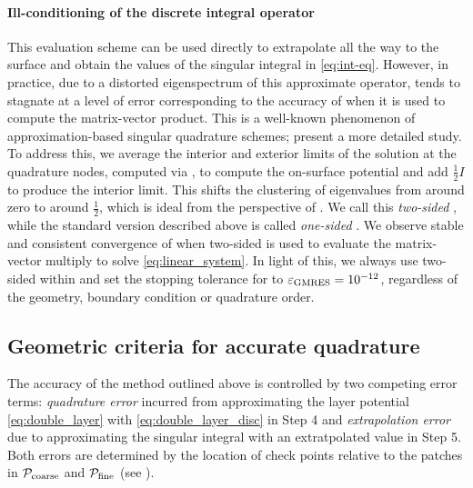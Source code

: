 \paragraph*{Ill-conditioning of the discrete integral operator}
This evaluation scheme can be used directly to extrapolate all the way to the surface and obtain the
values of the singular integral in \cref{eq:int-eq}.
However, in practice, due to a distorted eigenspectrum of this approximate operator, \gmres tends to stagnate at a level of error corresponding to the accuracy of \qbkix when it is used to compute the matrix-vector product.
This is a well-known phenomenon of approximation-based singular quadrature schemes; \cite[Section 3.5]{KBGN}\cite[Section 4.2]{RBZ} present a more detailed study.
To address this, we average the interior and exterior limits of the solution at the quadrature nodes, computed via \qbkix, to compute the on-surface potential and add $\frac{1}{2}I$ to produce the interior limit.
This shifts the clustering of eigenvalues from around zero to around $\frac{1}{2}$, which is ideal from the perspective of \gmres.
We call this \textit{two-sided} \qbkix, while the standard version described above is called \textit{one-sided} \qbkix.
We observe stable and consistent convergence of \gmres when two-sided \qbkix is used to evaluate the matrix-vector multiply to solve \cref{eq:linear_system}. 
In light of this, we always use two-sided \qbkix within \gmres and set the stopping tolerance for \gmres to $\err{\gmres}=10^{-12}$, regardless of the geometry, boundary condition or  quadrature order. 

\subsection{Geometric criteria for accurate quadrature\label{sec:geom_criteria}}
The accuracy of the method outlined above is controlled by two competing error terms: \textit{quadrature error} incurred from approximating the layer potential \cref{eq:double_layer} with \cref{eq:double_layer_disc} in Step 4 and \textit{extrapolation error} due to approximating the singular integral with an extratpolated value in Step 5.
Both errors are determined by the location of check points relative to the patches in ${\mathcal{P}_{\mathrm{coarse}}}$ and ${\mathcal{P}_{\mathrm{fine}}}$ (see ). 

